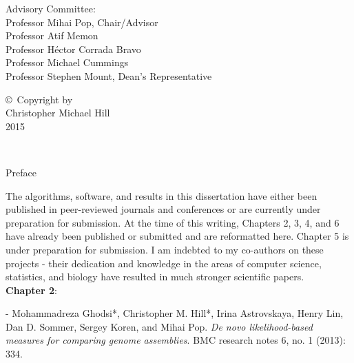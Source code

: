 \documentclass[12pt,\mydriver]{thesis}
\begin{document}
\vspace{7.5em}

\noindent Advisory Committee: \\
Professor Mihai Pop, Chair/Advisor \\
Professor Atif Memon \\
Professor H\'{e}ctor Corrada Bravo \\
Professor Michael Cummings \\
Professor Stephen Mount, Dean$\text{'}$s Representative
\clearpage{} 
\clearpage{}
\thispagestyle{empty}
\hbox{\ }

\vfill
\renewcommand{\baselinestretch}{1}
\small\normalsize

\vspace{-.65in}

\begin{center}
\large{\copyright \hbox{ }Copyright by\\
Christopher Michael Hill  \\
2015}
\end{center}

\vfill
\clearpage{} 

\pagestyle{plain}
\setcounter{page}{2}

\clearpage{}
\renewcommand{\baselinestretch}{2}
\small\normalsize
\hbox{\ }

\vspace{-.65in}

\begin{center}
\large{Preface}
\end{center}


The algorithms, software, and results in this dissertation have either been published in peer-reviewed journals and conferences or are currently under preparation for submission.
At the time of this writing, Chapters 2, 3, 4, and 6 have already been published or submitted and are reformatted here. Chapter 5 is under preparation for submission.
I am indebted to my co-authors on these projects - their dedication and knowledge in the areas of computer science, statistics, and biology have resulted in much stronger scientific papers. \\

\noindent\textbf{Chapter 2}:

\noindent - Mohammadreza Ghodsi*, Christopher M. Hill*, Irina Astrovskaya, Henry Lin, Dan D. Sommer, Sergey Koren, and Mihai  Pop. \textit{De novo likelihood-based measures for comparing genome assemblies}. BMC research notes 6, no. 1 (2013): 334.
\end{document}
